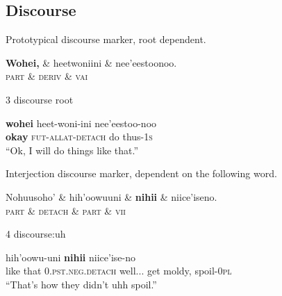 \documentclass{handout}
\begin{document}
\begin{multicols}{2}
\subsection{Discourse}
\footnotesize
\begin{exe}
\ex \label{dm} Prototypical discourse marker, root dependent.\\%
\begin{dependency}
\begin{deptext}
\textbf{Wohei,} \& heetwoniini \& nee'eestoonoo.\\
\textsc{part} \& \textsc{deriv} \& \textsc{vai}\\
\end{deptext}
	{3}	{discourse}
	{root}
\end{dependency}
\gll \textbf{wohei} heet-woni-ini {nee'eestoo-noo}\\
 \textbf{okay} \textsc{fut-allat-detach} {do thus-\textsc{1s}}\\
 \trans ``Ok, I will do things like that.''
\end{exe}
\begin{exe}
\ex \label{hesit} Interjection discourse marker, dependent on the following word.\\%
\begin{dependency}
\begin{deptext}
 Nohuusoho' \& hih'oowuuni \& \textbf{nihii} \& niice'iseno.\\
 \textsc{part} \& \textsc{detach} \& \textsc{part} \& \textsc{vii}\\
\end{deptext}
	{4}	{discourse:uh}
\end{dependency}
 hih'oowu-uni \textbf{nihii} {niice'ise-no}\\
 {like that} \textsc{0.pst.neg.detach} well...  {get moldy, spoil-\textsc{0pl}}\\
 \trans ``That's how they didn't uhh spoil.''
\end{exe}

\end{multicols}
\end{document}
